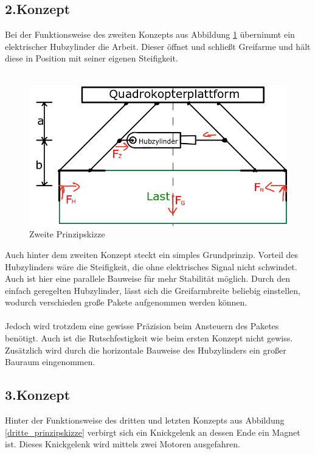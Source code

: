 \subsection{2.Konzept}
Bei der Funktionsweise des zweiten Konzepts aus Abbildung \ref{zweite_prinzipskizze} übernimmt ein elektrischer Hubzylinder die Arbeit. Dieser öffnet und schließt Greifarme und hält diese in Position mit seiner eigenen Steifigkeit.
\\
\\
\begin{figure}[h]
	\begin{center}
	\includegraphics[scale=0.7]{"Grafiken/Skizze2mechanik.png"}
	\caption{Zweite Prinzipskizze}
	\label{zweite_prinzipskizze}
	\end{center}
\end{figure}
\newpage
Auch hinter dem zweiten Konzept steckt ein simples Grundprinzip. Vorteil des Hubzylinders wäre die Steifigkeit, die ohne elektrisches Signal nicht schwindet. Auch ist hier eine parallele Bauweise für mehr Stabilität möglich. Durch den einfach geregelten Hubzylinder, lässt sich die Greifarmbreite beliebig einstellen, wodurch verschieden große Pakete aufgenommen werden können.\\
\\
Jedoch wird trotzdem eine gewisse Präzision beim Ansteuern des Paketes benötigt. Auch ist die Rutschfestigkeit wie beim ersten Konzept nicht gewiss. Zusätzlich wird durch die horizontale Bauweise des Hubzylinders ein großer Bauraum eingenommen.
 
\subsection{3.Konzept}
Hinter der Funktionsweise des dritten und letzten Konzepts aus Abbildung \ref{dritte_prinzipskizze} verbirgt sich ein Knickgelenk an dessen Ende ein Magnet ist. Dieses Knickgelenk wird mittels zwei Motoren ausgefahren.


